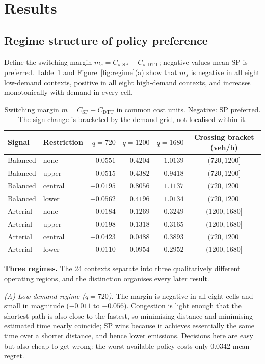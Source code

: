 \documentclass[10pt,a4paper]{article}
\begin{document}
\section{Results}
\subsection{Regime structure of policy preference}\label{sec:regime}
Define the switching margin $m_s=C_{s,\mathrm{SP}}-C_{s,\mathrm{DTT}}$; negative values mean SP is preferred. Table~\ref{tab:margin} and Figure~\ref{fig:regime}(a) show that $m_s$ is negative in all eight low-demand contexts, positive in all eight high-demand contexts, and increases monotonically with demand in every cell.

\begin{table}[htbp]\centering\small
\caption{Switching margin $m=C_{\mathrm{SP}}-C_{\mathrm{DTT}}$ in common cost units. Negative: SP preferred. The sign change is bracketed by the demand grid, not localised within it.}\label{tab:margin}
\begin{tabular}{llrrrc}\toprule
Signal & Restriction & $q=720$ & $q=1200$ & $q=1680$ & Crossing bracket (veh/h)\\\midrule
Balanced & none    & $-0.0551$ & $0.4204$ & $1.0139$ & $(720,1200]$\\
Balanced & upper   & $-0.0515$ & $0.4382$ & $0.9418$ & $(720,1200]$\\
Balanced & central & $-0.0195$ & $0.8056$ & $1.1137$ & $(720,1200]$\\
Balanced & lower   & $-0.0562$ & $0.4196$ & $1.0134$ & $(720,1200]$\\\midrule
Arterial & none    & $-0.0184$ & $-0.1269$ & $0.3249$ & $(1200,1680]$\\
Arterial & upper   & $-0.0198$ & $-0.1318$ & $0.3165$ & $(1200,1680]$\\
Arterial & central & $-0.0423$ & $0.0488$ & $0.3893$ & $(720,1200]$\\
Arterial & lower   & $-0.0110$ & $-0.0954$ & $0.2952$ & $(1200,1680]$\\
\bottomrule\end{tabular}\end{table}

\textbf{Three regimes.} The 24 contexts separate into three qualitatively different operating regions, and the distinction organises every later result.

\emph{(A) Low-demand regime ($q=720$).} The margin is negative in all eight cells and small in magnitude ($-0.011$ to $-0.056$). Congestion is light enough that the shortest path is also close to the fastest, so minimising distance and minimising estimated time nearly coincide; SP wins because it achieves essentially the same time over a shorter distance, and hence lower emissions. Decisions here are easy but also cheap to get wrong: the worst available policy costs only 0.0342 mean regret.
\end{document}
